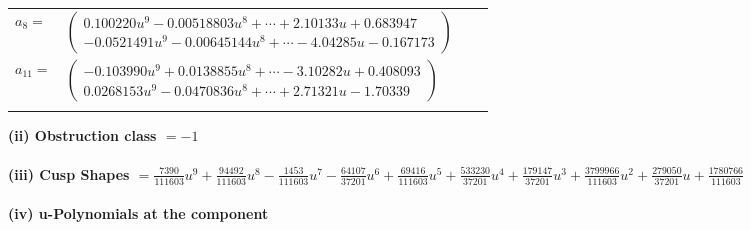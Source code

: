 \documentclass[1p]{elsarticle_modified}
\theoremstyle{definition}
\begin{document}
\begin{tabular}{m{7pt} m{180pt} m{7pt} m{180pt} }
\flushright $a_{8}=$&$\begin{pmatrix}0.100220 u^{9}-0.00518803 u^{8}+\cdots+2.10133 u+0.683947\\-0.0521491 u^{9}-0.00645144 u^{8}+\cdots-4.04285 u-0.167173\end{pmatrix}$ \\
\flushright $a_{11}=$&$\begin{pmatrix}-0.103990 u^{9}+0.0138855 u^{8}+\cdots-3.10282 u+0.408093\\0.0268153 u^{9}-0.0470836 u^{8}+\cdots+2.71321 u-1.70339\end{pmatrix}$\\&\end{tabular}
\flushleft \textbf{(ii) Obstruction class $= -1$}\\~\\
\flushleft \textbf{(iii) Cusp Shapes $= \frac{7390}{111603} u^9+\frac{94492}{111603} u^8-\frac{1453}{111603} u^7-\frac{64107}{37201} u^6+\frac{69416}{111603} u^5+\frac{533230}{37201} u^4+\frac{179147}{37201} u^3+\frac{3799966}{111603} u^2+\frac{279050}{37201} u+\frac{1780766}{111603}$}\\~\\
\newpage\renewcommand{\arraystretch}{1}
\flushleft \textbf{(iv) u-Polynomials at the component}\newline \\
\end{document}
